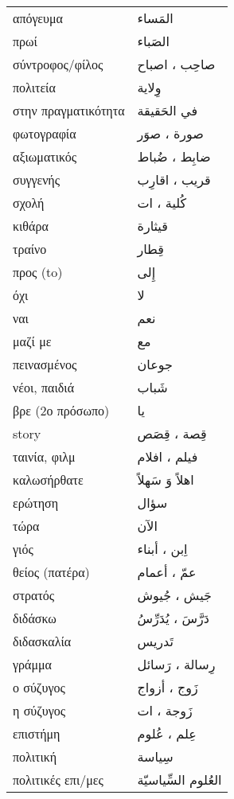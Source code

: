\documentclass[twocolumn,a4paper]{article}
\newcommand{\ar}[1]{\textarabic{#1}}
\newcommand{\pl}{\raisebox{0.15ex}{\footnotesize ◍}}
\newcommand{\normpl}[1]{\ar{ #1، ات }}
\newcommand{\vrf}{\raisebox{0.15ex}{\footnotesize ◉}}
\newcommand{\mas}{\raisebox{0.15ex}{\footnotesize ◫}}
\begin{document}
\begin{mpsupertabular}{ P{0.5\textwidth} P{0.5\textwidth} }
απόγευμα    & \ar{ المَساء } \\
πρωί        & \ar{ الصَباء } \\
σύντροφος/φίλος \pl & \ar{ صاحِب ، اصباح } \\
πολιτεία    & \ar{ وِﻻية } \\
στην πραγματικότητα & \ar{ في الحَقيقة } \\
φωτογραφία  \pl & \ar{ صورة ، صوَر } \\
αξιωματικός \pl & \ar{ ضابِط ، ضُباط } \\
συγγενής \pl   & \ar{ قريب ، اقارِب } \\
σχολή \pl      & \normpl{ كُلية } \\
κιθάρα         & \ar{ قيثارة } \\
τραίνο         & \ar{ قِطار } \\
προς (to)      & \ar{ إِلى } \\
όχι            & \ar{ لا } \\
ναι            & \ar{ نعم } \\
μαζί με        & \ar{ مع } \\
πεινασμένος    & \ar{ جوعان } \\
νέοι, παιδιά    & \ar{ شَباب } \\
βρε (2ο πρόσωπο) & \ar{ يا } \\
story          & \ar{ قِصة ، قِصَص } \\
ταινία, φιλμ \pl & \ar{ فيلم ، افلام } \\
καλωσήρθατε    & \ar{ اهلاً وَ سَهلاً } \\
ερώτηση        & \ar{ سؤال } \\
τώρα           & \ar{ اﻵن } \\
γιός \pl       & \ar{ اِبن ، أبناء } \\
θείος (πατέρα) \pl & \ar{ عمّ ، أعمام } \\
στρατός \pl    & \ar{ جَيش ، جُيوش } \\
διδάσκω \vrf   & \ar{ دَرَّسَ ، يُدَرِّسُ } \\  %
διδασκαλία \mas & \ar{ تَدريس } \\
γράμμα \pl     & \ar{ رِسالة ، رَسائل } \\
ο σύζυγος \pl  & \ar{ زَوج ، أزواج } \\
η σύζυγος \pl & \normpl{ زَوجة } \\
επιστήμη \pl   & \ar{ عِلم ، عُلوم } \\
πολιτική       & \ar{ سِياسة } \\
πολιτικές επι/μες & \ar{ العُلوم السِّياسيّة } \\

\end{mpsupertabular}
\end{document}
